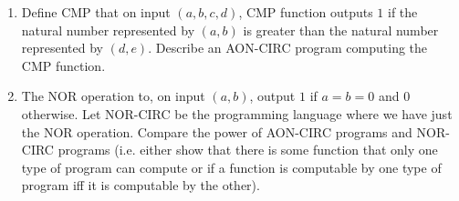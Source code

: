 \documentclass[11pt]{article}
\theoremstyle{definition}
\theoremstyle{remark}
\providecommand{\tightlist}{%
  \setlength{\itemsep}{0pt}\setlength{\parskip}{0pt}}
\begin{document}
\begin{enumerate}
\tightlist
\item Define CMP that on input $(a,b,c,d)$, CMP function outputs $1$ if the natural number represented by $(a,b)$ is greater than the natural number represented by $(d,e)$. Describe an AON-CIRC program computing the CMP function.
\vspace{2in}


\item The NOR operation to, on input $(a,b)$, output $1$ if $a=b=0$ and $0$ otherwise. Let NOR-CIRC be the programming
language where we have just the NOR operation. Compare the power
of AON-CIRC programs and NOR-CIRC programs (i.e. either show that there is some function that only one type of program can compute or if a function is computable by one type of program iff it is computable by the other).
\end{enumerate}
\end{document}
